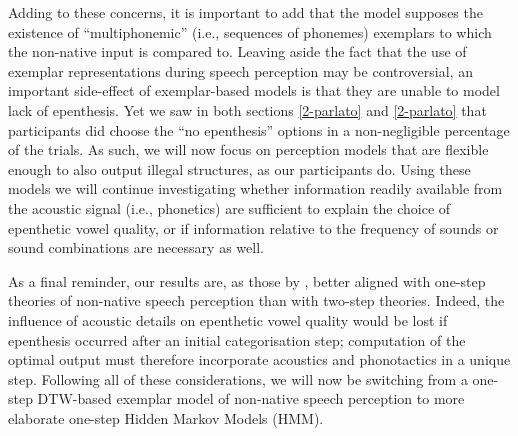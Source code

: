 Adding to these concerns, it is important to add that the model supposes the existence of ``multiphonemic'' (i.e., sequences of phonemes) exemplars to which the non-native input is compared to. Leaving aside the fact that the use of exemplar representations during speech perception may be controversial, an important side-effect of exemplar-based models is that they are unable to model lack of epenthesis. Yet we saw in both sections \ref{2-parlato} and \ref{2-parlato} that participants did choose the ``no epenthesis'' options in a non-negligible percentage of the trials. As such, we will now focus on perception models that are flexible enough to also output illegal structures, as our participants do. Using these models we will continue investigating whether information readily available from the acoustic signal (i.e., phonetics) are sufficient to explain the choice of epenthetic vowel quality, or if information relative to the frequency of sounds or sound combinations are necessary as well.  

As a final reminder, our results are, as those by \cite{dupoux2011}, better aligned with one-step theories of non-native speech perception than with two-step theories. Indeed, the influence of acoustic details on epenthetic vowel quality would be lost if epenthesis occurred after an initial categorisation step; computation of the optimal output must therefore incorporate acoustics and phonotactics in a unique step. Following all of these considerations, we will now be switching from a one-step DTW-based exemplar model of non-native speech perception to more elaborate one-step Hidden Markov Models (HMM).

